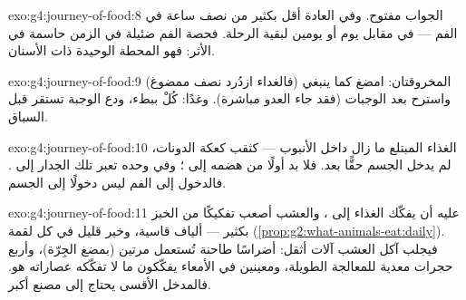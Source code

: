 \begin{solution}{exo:g4:journey-of-food:8}
الجواب مفتوح. وفي العادة أقل بكثير من نصف ساعة في الفم --- في
مقابل يوم أو يومين لبقية الرحلة. فحصة الفم ضئيلة في الزمن حاسمة في
الأثر: فهو المحطة الوحيدة ذات الأسنان.
\end{solution}

\begin{solution}{exo:g4:journey-of-food:9}
المخروقتان: امضغ كما ينبغي (فالغداء ازدُرد نصف ممضوغ) واسترح بعد
الوجبات (فقد جاء العدو مباشرة). وغدًا: كُلْ ببطء، ودع الوجبة تستقر
قبل السباق.
\end{solution}

\begin{solution}{exo:g4:journey-of-food:10}
الغذاء المبتلع ما زال داخل الأنبوب --- كثقب كعكة الدونات، لم يدخل
الجسم حقًّا بعد. فلا بد أولًا من هضمه إلى ؛ وفي 
وحده تعبر تلك  الجدار إلى . فالدخول إلى الفم ليس دخولًا
إلى الجسم.
\end{solution}

\begin{solution}{exo:g4:journey-of-food:11}
 عليه أن يفكّك الغذاء إلى ، والعشب أصعب تفكيكًا من الخبز
بكثير --- ألياف قاسية، وخير قليل في كل لقمة
(\cref{prop:g2:what-animals-eat:daily}). فيجلب آكل العشب آلات
أثقل: أضراسًا طاحنة تُستعمل مرتين (بمضغ الجِرّة)، وأربع حجرات معدية
للمعالجة الطويلة، ومعينين في الأمعاء يفكّكون ما لا تفكّكه عصاراته
هو. فالمدخل الأقسى يحتاج إلى مصنع أكبر.
\end{solution}
